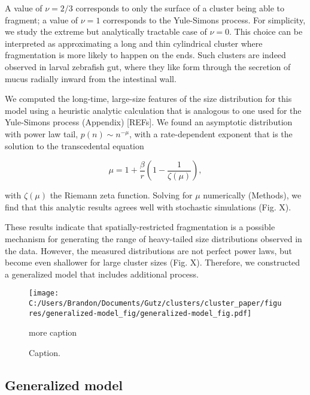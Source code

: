 \documentclass[aps,pre,twocolumn]{revtex4-1}
\def\be{\begin{equation}}
\def\ee{\end{equation}}
\begin{document}
A value of $\nu = 2/3$ corresponds to only the surface of a cluster being able to fragment; a value of $\nu=1$ corresponds to the Yule-Simons process. For simplicity, we study the extreme but analytically tractable case of $\nu=0$. This choice can be interpreted as approximating a long and thin cylindrical cluster where fragmentation is more likely to happen on the ends. Such clusters are indeed observed in larval zebrafish gut, where they like form through the secretion of mucus radially inward from the intestinal wall. 
 
We computed the long-time, large-size features of the size distribution for this model using a heuristic analytic calculation that is analogous to one used for the Yule-Simons process (Appendix) [REFs]. We found an asymptotic distribution with power law tail, $p(n)\sim n^{-\mu}$, with a rate-dependent exponent that is the solution to the transcedental equation
 
\be
\mu = 1 + \frac{\beta}{r}\left(1-\frac{1}{\zeta(\mu)}\right),
\ee

\noindent with $\zeta(\mu)$ the Riemann zeta function. Solving for $\mu$ numerically (Methods), we find that this analytic results agrees well with stochastic simulations (Fig. X).

These results indicate that spatially-restricted fragmentation is a possible mechanism for generating the range of heavy-tailed size distributions observed in the data. However, the measured distributions are not perfect power laws, but become even shallower for large cluster sizes (Fig. X). Therefore, we constructed a generalized model that includes additional process. 
 
\begin{figure*}%
	\centerline{
		\texttt{[image: C:/Users/Brandon/Documents/Gutz/clusters/cluster\_paper/figures/generalized-model\_fig/generalized-model\_fig.pdf]}}
	\caption{Caption.}{more caption}
	\label{fig:generalized-fig}
\end{figure*}


\subsection{Generalized model}
\end{document}
